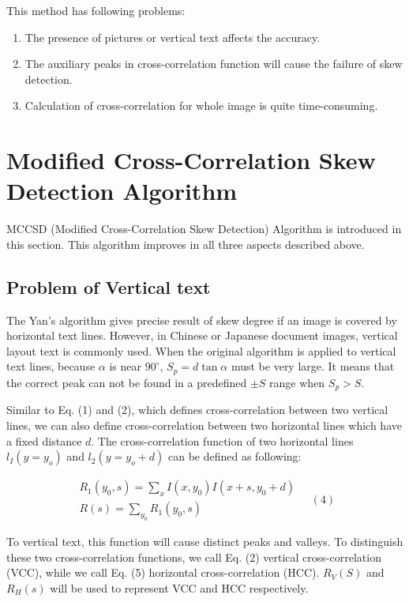 \documentclass[conference]{IEEEtran}
\begin{document}
	This method has following problems:
	\begin{enumerate}
		\item The presence of pictures or vertical text affects the accuracy.
		\item The auxiliary peaks in cross-correlation function will cause the failure of skew detection.
		\item Calculation of cross-correlation for whole image is quite time-consuming.
	\end{enumerate}
	
	\section{Modified Cross-Correlation Skew Detection Algorithm}
	MCCSD (Modified Cross-Correlation Skew Detection) Algorithm is introduced in this section. This algorithm improves in all three aspects described above.
	
	\subsection{Problem of Vertical text}
	The Yan's algorithm gives precise result of skew degree if an image is covered by horizontal text lines. However, in Chinese or Japanese document images, vertical layout text is commonly used. When the original algorithm is applied to vertical text lines, because $\alpha$ is near $90^{\circ}$, $S_{p} = d \tan \alpha$ must be very large. It means that the correct peak can not be found in a predefined $\pm S$ range when $S_{p} > S$.
	
	Similar to Eq. (1) and (2), which defines cross-correlation between two vertical lines, we can also define cross-correlation between two horizontal lines which have a fixed distance $d$. The cross-correlation function of two horizontal lines $l_{I}(y = y_{o})$ and $l_{2}(y = y_{o} + d)$ can be defined as following:
	
	\[
	\begin{array}{l}
		R_{1}(y_{0},s) = \sum_{x} I(x,y_{0})I(x + s,y_{0} + d) \\
		R(s) = \sum_{y_{0}} R_{1}(y_{0},s)
	\end{array} \quad (4)
	\]
	
	To vertical text, this function will cause distinct peaks and valleys. To distinguish these two cross-correlation functions, we call Eq. (2) vertical cross-correlation (VCC), while we call Eq. (5) horizontal cross-correlation (HCC). $R_{V}(S)$ and $R_{H}(s)$ will be used to represent VCC and HCC respectively.
	
\end{document}

